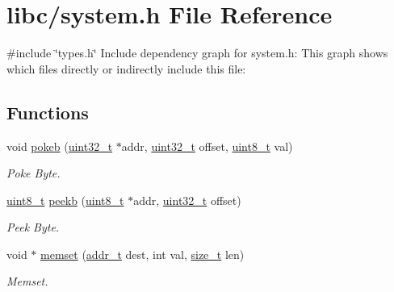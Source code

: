 \hypertarget{a00059}{}\section{libc/system.h File Reference}
\label{a00059}
{\ttfamily \#include \char`\"{}types.\+h\char`\"{}}\newline
Include dependency graph for system.\+h\+:
This graph shows which files directly or indirectly include this file\+:
\subsection*{Functions}
\begin{DoxyCompactItemize}
\item 
void \hyperlink{a00059_aa291c9926b84df379482632e80ec7c47_aa291c9926b84df379482632e80ec7c47}{pokeb} (\hyperlink{a00068_a435d1572bf3f880d55459d9805097f62_a435d1572bf3f880d55459d9805097f62}{uint32\+\_\+t} $\ast$addr, \hyperlink{a00068_a435d1572bf3f880d55459d9805097f62_a435d1572bf3f880d55459d9805097f62}{uint32\+\_\+t} offset, \hyperlink{a00068_aba7bc1797add20fe3efdf37ced1182c5_aba7bc1797add20fe3efdf37ced1182c5}{uint8\+\_\+t} val)
\begin{DoxyCompactList}\small\item\em Poke Byte. \end{DoxyCompactList}\item 
\hyperlink{a00068_aba7bc1797add20fe3efdf37ced1182c5_aba7bc1797add20fe3efdf37ced1182c5}{uint8\+\_\+t} \hyperlink{a00059_a353956c1fd65c7ed787836534fc9354e_a353956c1fd65c7ed787836534fc9354e}{peekb} (\hyperlink{a00068_aba7bc1797add20fe3efdf37ced1182c5_aba7bc1797add20fe3efdf37ced1182c5}{uint8\+\_\+t} $\ast$addr, \hyperlink{a00068_a435d1572bf3f880d55459d9805097f62_a435d1572bf3f880d55459d9805097f62}{uint32\+\_\+t} offset)
\begin{DoxyCompactList}\small\item\em Peek Byte. \end{DoxyCompactList}\item 
void $\ast$ \hyperlink{a00059_a1df1047f254598ae1c402f654bfc787f_a1df1047f254598ae1c402f654bfc787f}{memset} (\hyperlink{a00068_a295f71165288684c38c6bb836fbb3c59_a295f71165288684c38c6bb836fbb3c59}{addr\+\_\+t} dest, int val, \hyperlink{a00026_a7c94ea6f8948649f8d181ae55911eeaf_a7c94ea6f8948649f8d181ae55911eeaf}{size\+\_\+t} len)
\begin{DoxyCompactList}\small\item\em Memset. \end{DoxyCompactList}\end{DoxyCompactItemize}


